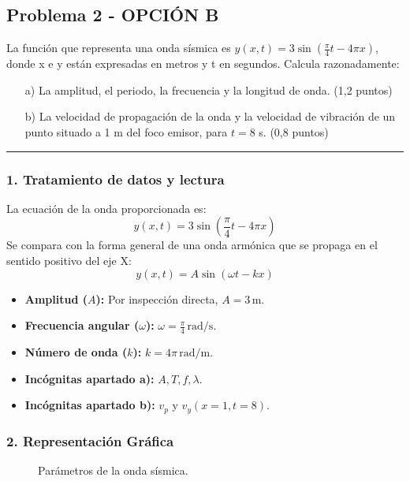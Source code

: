 \newpage

\subsection{Problema 2 - OPCIÓN B}
\label{subsec:2B_2018_jun_ord}
\begin{cajaenunciado}
La función que representa una onda sísmica es $y(x,t)=3\sin(\frac{\pi}{4}t-4\pi x)$, donde x e y están expresadas en metros y t en segundos. Calcula razonadamente:
\begin{itemize}
    \item[a)] La amplitud, el periodo, la frecuencia y la longitud de onda. (1,2 puntos)
    \item[b)] La velocidad de propagación de la onda y la velocidad de vibración de un punto situado a 1 m del foco emisor, para $t=8$ s. (0,8 puntos)
\end{itemize}
\end{cajaenunciado}
\hrule

\subsubsection*{1. Tratamiento de datos y lectura}
La ecuación de la onda proporcionada es:
$$ y(x,t)=3\sin\left(\frac{\pi}{4}t - 4\pi x\right) $$
Se compara con la forma general de una onda armónica que se propaga en el sentido positivo del eje X:
$$ y(x,t)=A\sin(\omega t - kx) $$
\begin{itemize}
    \item \textbf{Amplitud ($A$):} Por inspección directa, $A = 3 \, \text{m}$.
    \item \textbf{Frecuencia angular ($\omega$):} $\omega = \frac{\pi}{4} \, \text{rad/s}$.
    \item \textbf{Número de onda ($k$):} $k = 4\pi \, \text{rad/m}$.
    \item \textbf{Incógnitas apartado a):} $A, T, f, \lambda$.
    \item \textbf{Incógnitas apartado b):} $v_p$ y $v_y(x=1, t=8)$.
\end{itemize}

\subsubsection*{2. Representación Gráfica}
\begin{figure}[H]
    \centering
    \caption{Parámetros de la onda sísmica.}
\end{figure}


